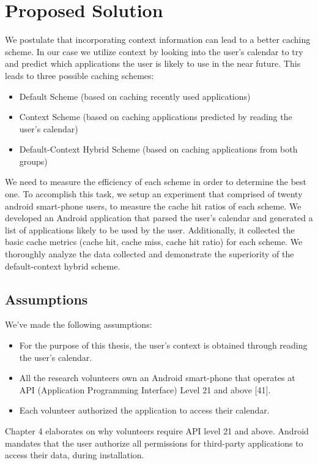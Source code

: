 \documentclass[12pt]{uthesis-v12}  %
\begin{document}
	\section{Proposed Solution}		
		We postulate that incorporating context information can lead to a better caching scheme. In our case we utilize context by looking into the user's calendar to try and predict which applications the user is likely to use in the near future. This leads to three possible caching schemes:
		
		\begin{itemize}
			\item Default Scheme (based on caching recently used applications)
			\item Context Scheme (based on caching applications predicted by reading the user's calendar)
			\item Default-Context Hybrid Scheme (based on caching applications from both groups)
		\end{itemize}
		
		We need to measure the efficiency of each scheme in order to determine the best one. To accomplish this task, we setup an experiment that comprised of twenty android smart-phone users, to measure the cache hit ratios of each scheme. We developed an Android application that parsed the user's calendar and generated a list of applications likely to be used by the user. Additionally, it collected the basic cache metrics (cache hit, cache miss, cache hit ratio) for each scheme. We thoroughly analyze the data collected and demonstrate the superiority of the default-context hybrid scheme.  
		
		\subsection{Assumptions}	
			We've made the following assumptions:
			\begin{itemize}
				\item For the purpose of this thesis, the user's context is obtained through reading the user's calendar.
				\item All the research volunteers own an Android smart-phone that operates at API (Application Programming Interface) Level 21 and above [41].
				\item Each volunteer authorized the application to access their calendar.
			\end{itemize}
			
			Chapter 4 elaborates on why volunteers require API level 21 and above. Android mandates that the user authorize all permissions for third-party applications to access their data, during installation.
			
\end{document}
